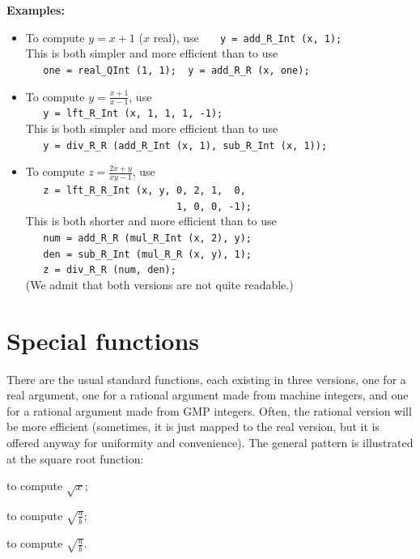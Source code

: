 \documentclass[a4paper,12pt]{article}
\newenvironment{funlist}{\begin{list}%
   {}%
   {\topsep=0pt%
        \leftmargin=0cm%
        \rightmargin=0cm%
        \listparindent=0cm%
        \parskip=10pt%
        \partopsep=0pt%
        \itemsep=0pt%
        \parsep=0pt}}%
   {\end{list}}
\begin{document}
\noindent \textbf{Examples:}
\vspace{-1.0ex}
\begin{itemize}
\item   To compute $y = x+1$ ($x$ real), use\quad
        \verb|   y = add_R_Int (x, 1);|\\[0.5ex]
        This is both simpler and more efficient than to use\\[0.5ex]
        \verb|   one = real_QInt (1, 1);  y = add_R_R (x, one);|
\item   To compute $y = \frac{x+1}{x-1}$, use\\[0.5ex]
        \verb|   y = lft_R_Int (x, 1, 1, 1, -1);|\\[0.5ex]
        This is both simpler and more efficient than to use\\[0.5ex]
        \verb|   y = div_R_R (add_R_Int (x, 1), sub_R_Int (x, 1));|
\item   To compute $z = \frac{2x+y}{xy-1}$, use\\[0.5ex]
        \verb|   z = lft_R_R_Int (x, y, 0, 2, 1,  0,|\\
        \verb|                          1, 0, 0, -1);|\\[0.5ex]
        This is both shorter and more efficient than to use\\[0.5ex]
        \verb|   num = add_R_R (mul_R_Int (x, 2), y);|\\
        \verb|   den = sub_R_Int (mul_R_R (x, y), 1);|\\
        \verb|   z = div_R_R (num, den);|\\[0.5ex]
        (We admit that both versions are not quite readable.)
\end{itemize}

\section{Special functions}

There are the usual standard functions,
each existing in three versions,
one for a real argument, one for a rational argument made from machine integers,
and one for a rational argument made from GMP integers.
Often, the rational version will be more efficient
(sometimes, it is just mapped to the real version,
 but it is offered anyway for uniformity and convenience).
The general pattern is illustrated at the square root function:

\begin{funlist}
\item {}
  to compute $\sqrt{x}$;
\item {}
  to compute $\sqrt{\frac{a}{b}}$;
\item {}
  to compute $\sqrt{\frac{a}{b}}$.
\end{funlist}
\vspace{-1ex}
\end{document}
